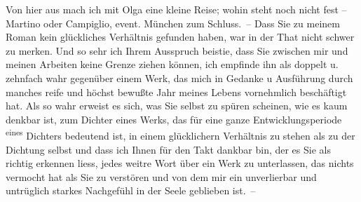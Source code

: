 \pstart
           Von hier aus mach ich mit Olga eine kleine
               Reise; wohin steht noch nicht fest – Martino
               oder Campiglio, event. München zum Schluss. – Dass Sie zu {\pb}meinem Roman kein
               glückliches Verhältnis gefunden haben, war in der That nicht schwer zu merken. Und so
               sehr ich Ihrem Ausspruch beisti{\geminationm}e, dass Sie zwischen mir
               und meinen Arbeiten keine Grenze ziehen können, ich empfinde ihn als doppelt u.
               zehnfach wahr gegenüber einem Werk, das mich in Gedanke u Ausführung durch manches
               reife und \introOben{}höchst\introOben{} bewußte Jahr meines Lebens vornehmlich
               beschäftigt hat. Als so wahr erweist es sich, was Sie selbst zu spüren scheinen, wie
               es kaum denkbar ist, zum Dichter eines Werks, das für eine {\pb}ganze Entwicklungsperiode \substVorne{}\textsuperscript{eines}\substDazwischen{}\label{T_L01786-1v}\label{T_L01786-1}\substHinten{} Dichters bedeutend ist, in einem glücklichern Verhältnis zu stehen als zu
               der Dichtung selbst und dass ich Ihnen für den Takt dankbar bin, der es Sie als
               richtig erkennen liess, jedes weitre Wort über ein Werk zu unterlassen, das nichts vermocht hat als Sie zu verstören und von
               dem mir ein unverlierbar und untrüglich starkes \introOben{}\strikeout{\textcolor{gray}{×}\-\textcolor{gray}{×}\-\textcolor{gray}{×}\-\textcolor{gray}{×}\-\textcolor{gray}{×}\-\textcolor{gray}{×}\-\textcolor{gray}{×}\-\textcolor{gray}{×}\-\textcolor{gray}{×}\-\textcolor{gray}{×}}\introOben{} Nachgefühl in der Seele geblieben ist. –\pend
           
